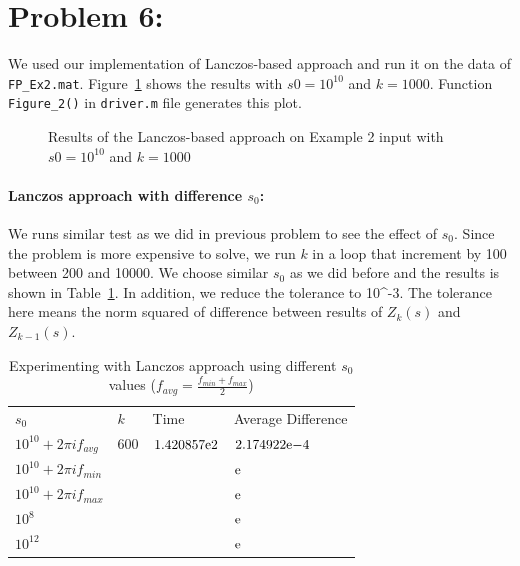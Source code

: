 \section*{Problem 6:}
We used our implementation of Lanczos-based approach and run it on the data of \texttt{FP\_Ex2.mat}. Figure~\ref{fig:fig2} shows the results with $s0 = 10^{10}$ and $k = 1000$.  Function \texttt{Figure\_2()} in \texttt{driver.m} file generates this plot. 

\begin{figure}[!tbh]
\centering        
   \caption{Results of the Lanczos-based approach on Example 2 input with $s0 = 10^{10}$ and $k = 1000$ }
   \label{fig:fig2}
\end{figure}

\paragraph{Lanczos approach with difference $s_{0}$:}  We runs similar test as we did in previous problem to see the effect of $s_{0}$. Since the problem is more expensive to solve, we run $k$ in a loop that increment by 100 between 200 and 10000. We choose similar $s_{0}$ as we did before and the results is shown in Table~\ref{tab:s02}. In addition, we reduce the tolerance to 10^{-3}. The tolerance here means the norm squared of difference between results of $Z_{k}(s)$ and $Z_{k-1}(s)$. 


\begin{table}[!tbh]
 \centering    
\begin{tabular}{ ||p{3.0cm}|p{1.5cm}| p{4cm}| p{4cm}||}
\hline
 $s_{0}$  & $k$ & Time & Average Difference \\ \hhline{|=|=|=|=|}   
 
 $10^{10} + 2 \pi i f_{avg}$ & 600 & ${1.420857}\mathrm{e}{2}$ & ${2.174922}\mathrm{e}{-4}$ \\
 $10^{10} + 2 \pi i f_{min}$ & & & ${}\mathrm{e}{}$ \\
 $10^{10} + 2 \pi i f_{max}$ & & & ${}\mathrm{e}{}$\\
 $10^{8} $                   & & & ${}\mathrm{e}{}$ \\
 $10^{12}$                   & & & ${}\mathrm{e}{}$\\  
\hline
\end{tabular} 
\caption{Experimenting with Lanczos approach using different $s_{0}$ values ($f_{avg} = \frac{f_{min}+f_{max}}{2}$) }
   \label{tab:s02}
\end{table}